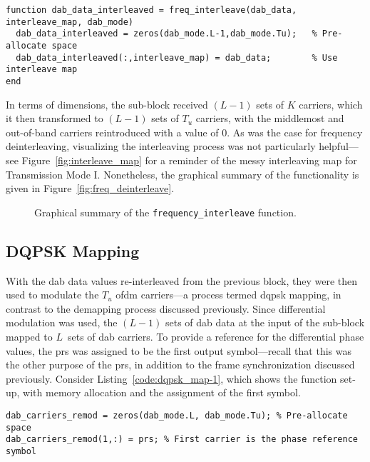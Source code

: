 \documentclass[class=report,11pt,crop=false]{standalone}
\begin{document}
\begin{lstlisting}[caption={MATLAB code for the frequency interleaving functionality.},label={code:freq_interleave}]
function dab_data_interleaved = freq_interleave(dab_data, interleave_map, dab_mode)
  dab_data_interleaved = zeros(dab_mode.L-1,dab_mode.Tu);   % Pre-allocate space
  dab_data_interleaved(:,interleave_map) = dab_data;        % Use interleave map
end
\end{lstlisting}

In terms of dimensions, the sub-block received \((L-1)\) sets of \(K\) carriers, which it then transformed to \((L-1)\) sets of \(T_u\) carriers, with the middlemost and out-of-band carriers reintroduced with a value of 0. As was the case for frequency deinterleaving, visualizing the interleaving process was not particularly helpful---see Figure~\ref{fig:interleave_map} for a reminder of the messy interleaving map for Transmission Mode I. Nonetheless, the graphical summary of the functionality is given in Figure~\ref{fig:freq_deinterleave}.

\begin{figure}[htbp]
  \centering
  \captionsetup{type=figure}
  \def\svgwidth{\linewidth}
  { %
  }
  \caption{Graphical summary of the \texttt{frequency\_interleave} function.}
  \label{fig:freq_interleave}
\end{figure}

\subsection{DQPSK Mapping \label{subsect:dab-proc_dqpsk-map}}
With the \gls{dab} data values re-interleaved from the previous block, they were then used to modulate the \(T_u\) \gls{ofdm} carriers---a process termed \gls{dqpsk} mapping, in contrast to the demapping process discussed previously. Since differential modulation was used, the \((L-1)\) sets of \gls{dab} data at the input of the sub-block mapped to \(L\)~sets of \gls{dab} carriers. To provide a reference for the differential phase values, the \gls{prs} was assigned to be the first output symbol---recall that this was the other purpose of the \gls{prs}, in addition to the frame synchronization discussed previously. Consider Listing~\ref{code:dqpsk_map-1}, which shows the function set-up, with memory allocation and the assignment of the first symbol.

\begin{lstlisting}[caption={MATLAB code for setting up the \texttt{dqpsk\_map} function.},label={code:dqpsk_map-1}]
dab_carriers_remod = zeros(dab_mode.L, dab_mode.Tu); % Pre-allocate space
dab_carriers_remod(1,:) = prs; % First carrier is the phase reference symbol
\end{lstlisting}
\end{document}
